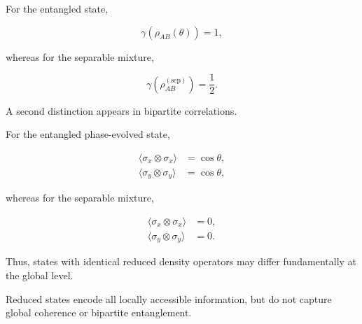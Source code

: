 For the entangled state,

\begin{equation}
\gamma
\left(
\rho_{AB}(\theta)
\right)
=
1,
\label{eq:appendix_entangled_purity}
\end{equation}

whereas for the separable mixture,

\begin{equation}
\gamma
\left(
\rho_{AB}^{(\mathrm{sep})}
\right)
=
\frac{1}{2}.
\label{eq:appendix_separable_purity}
\end{equation}

A second distinction appears in bipartite correlations.

For the entangled phase-evolved state,

\begin{align}
\langle
\sigma_x \otimes \sigma_x
\rangle
&=
\cos\theta,
\nonumber
\\
\langle
\sigma_y \otimes \sigma_y
\rangle
&=
\cos\theta,
\label{eq:appendix_entangled_correlations}
\end{align}

whereas for the separable mixture,

\begin{align}
\langle
\sigma_x \otimes \sigma_x
\rangle
&=
0,
\nonumber
\\
\langle
\sigma_y \otimes \sigma_y
\rangle
&=
0.
\label{eq:appendix_separable_correlations}
\end{align}

\medskip

Thus, states with identical reduced density operators may differ fundamentally at the global level.

Reduced states encode all locally accessible information, but do not capture global coherence or bipartite entanglement.